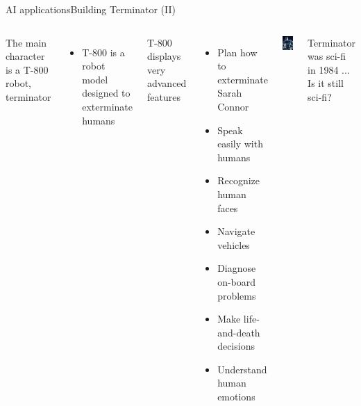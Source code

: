 \documentclass[10pt,compress]{beamer} %
\begin{document}
\begin{frame}{AI applications}{Building Terminator (II)}
	\begin{columns}
			The main character is a T-800 robot, terminator
			\begin{itemize}
			\item T-800 is a robot model designed to exterminate humans
			\end{itemize}
			T-800 displays very advanced features
			\begin{itemize}
            \item Plan how to exterminate Sarah Connor
			\item Speak easily with humans
			\item Recognize human faces
			\item Navigate vehicles
			\item Diagnose on-board problems
			\item Make life-and-death decisions
			\item Understand human emotions
			\end{itemize}
	   	\begin{center}
		\includegraphics[width=0.8\linewidth]{figs/t-800.jpg}
		\end{center}
		\begin{block}{}
			Terminator was sci-fi in 1984 ... Is it still sci-fi?
		\end{block}
	\end{columns}
\end{frame}
\end{document}
